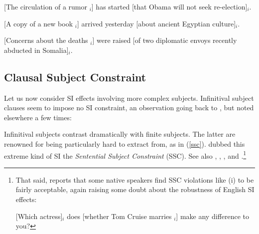 \documentclass[output=paper
	        ,collection
	        ,collectionchapter
 	        ,biblatex
                ,babelshorthands
                ,newtxmath
                ,draftmode
                ,colorlinks, citecolor=brown
]{langscibook}
\begin{document}
\eal \label{subxxx}
\ex {}[The circulation of a rumor \spc$_i$]
has started [that Obama will not seek re-election]$_i$.

\ex {}[A  copy of a new book \spc$_i$] arrived
yesterday [about ancient Egyptian culture]$_i$.

\ex {}[Concerns about the deaths  \spc$_i$] were
raised [of two diplomatic envoys recently abducted in Somalia]$_i$.
\zl


\subsection{Clausal Subject Constraint}

Let us now consider SI effects involving more complex subjects.
Infinitival subject clauses seem to impose no SI constraint, an observation going
back to \citet{kunotakamib}, but noted elsewhere a few times:

\eal \label{vpsi}


\zl




\noindent
Infinitival subjects contrast dramatically with finite  subjects. The latter are renowned for being particularly hard to extract from,  as in  (\ref{ssc}).
  \citet{Ross67} dubbed this extreme kind of SI the  \emph{Sentential Subject Constraint} (SSC). See also  \citet{chomsky73}, \citet{huang82},  \citet{Chomsky86b}, and \citet{freidin92}.\footnote{That said, \citet{chavessubj} reports that some native speakers find SSC violations like  (i) to be fairly acceptable, again raising some doubt about the robustness of English SI effects:

\ea
{}[Which actress]$_i$ does [whether Tom Cruise marries \spc$_i$] make any difference to you?
\zlast
}


\eal \label{ssc}
\end{document}
